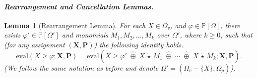 \documentclass[10pt]{amsart}
\theoremstyle{plain}
\newtheorem{lemma}{Lemma}[section]
\theoremstyle{definition}
\providecommand{\bP}[0]{\ensuremath{\mathbf P}\xspace}
\providecommand{\bX}[0]{\ensuremath{\mathbf X}\xspace}
\let\geq\geqslant
\providecommand{\cplus}[0]{\ensuremath{\hat{\oplus}}\xspace}
\providecommand{\cmult}[0]{\ensuremath{{\,\mathring{\star}\,}}\xspace}
\providecommand{\evalmap}[0]{\ensuremath{\mathrm{eval}}\xspace}
\begin{document}
\paragraph{\emph{Rearrangement and Cancellation Lemmas.}}


\begin{lemma}[Rearrangement Lemma]\label{lem:rearrangement}
    For each $X\in\Omega_v$, and $\varphi \in \mathbb{P}[\Omega]$, there  exists $\varphi' \in \mathbb{P}[\Omega']$ and monomials $M_1, M_2, \dotsc, M_k$ over $\Omega'$, where $k\geq 0$, such that (for any assignment $(\bX,\bP)$) the following identity holds. 
        $$\evalmap(X\geq \varphi ; \bX,\bP) = \evalmap\left(X\geq\varphi' \;\cplus\; X\cmult M_1 \;\cplus\; \dotsi \;\cplus\; X\cmult M_k ;\bX,\bP\right).$$
        (We follow the same notation as before and
denote $\Omega' = (\Omega_v - \{X\},\Omega_p)$).

\end{lemma}
\end{document}
